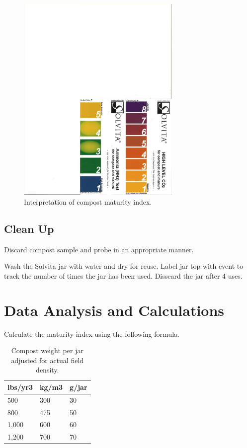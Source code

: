 \documentclass[12pt]{../SOP4_alpha}\usepackage[]{graphicx}\usepackage[]{xcolor}
\begin{document}
\begin{figure}[ht]
\centering
\includegraphics[width=0.70\textwidth]{graphics/Solvita_Color_Chart_NH3_CO2}
\caption{Interpretation of compost maturity index.}
\label{fig:CompostMaturity}
\end{figure}

\subsection{Clean Up}

\NP Discard compost sample and probe in an appropriate manner.

\NP Wash the Solvita jar with water and dry for reuse. Label jar top with event to track the number of times the jar has been used. Disscard the jar after 4 uses.

\section{Data Analysis and Calculations}

\NP Calculate the maturity index using the following formula.

\begin{table}[ht]
\caption{Compost weight per jar adjusted for actual field density.}
\label{tab:jarweight}
\centering
\begin{tabular}{lll}
  \hline
 \textbf{lbs/yr3} & \textbf{kg/m3} & \textbf{g/jar} \\ 
  \hline \hline
  500   & 300   & 30 \\
  800   & 475   & 50 \\
  1,000 & 600   & 60 \\
  1,200 & 700   & 70 \\ \hline
\end{tabular}
\end{table}
\end{document}
